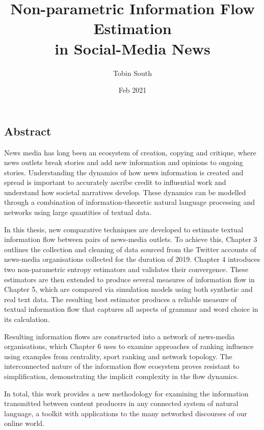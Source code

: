 \documentclass[12pt, a4]{article}
\title{Non-parametric Information Flow Estimation\\in Social-Media News}
\author{Tobin South}
\date{Feb 2021}
\begin{document}
\maketitle

\subsection*{Abstract}
News media has long been an ecosystem of creation, copying and critique, where news outlets break stories and add new information and opinions to ongoing stories. Understanding the dynamics of how news information is created and spread is important to accurately ascribe credit to influential work and understand how societal narratives develop. 
These dynamics can be modelled through a combination of information-theoretic natural language processing and networks using large quantities of textual data. 

In this thesis, new comparative techniques are developed to estimate textual information flow between pairs of news-media outlets. To achieve this, Chapter 3 outlines the collection and cleaning of data sourced from the Twitter accounts of news-media organisations collected for the duration of 2019. Chapter 4 introduces two non-parametric entropy estimators and validates their convergence. These estimators are then extended to produce several measures of information flow in Chapter 5, which are compared via simulation models using both synthetic and real text data. The resulting best estimator produces a reliable measure of textual information flow that captures all aspects of grammar and word choice in its calculation. 

Resulting information flows are constructed into a network of news-media organisations, which Chapter 6 uses to examine approaches of ranking influence using examples from centrality, sport ranking and network topology. The interconnected nature of the information flow ecosystem proves resistant to simplification, demonstrating the implicit complexity in the flow dynamics.

In total, this work provides a new methodology for examining the information transmitted between content producers in any connected system of natural language, a toolkit with applications to the many networked discourses of our online world. 
\end{document}
